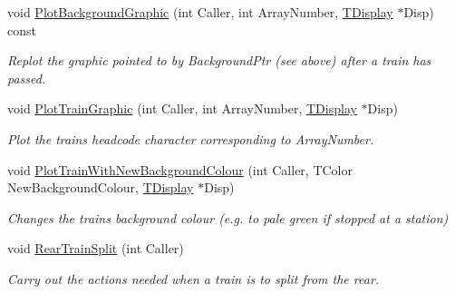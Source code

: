 \begin{DoxyCompactItemize}
\item 
\mbox{\label{class_t_train_abb6bb7d2024ac59230cbaff2ec3ee999}} 
void \mbox{\hyperlink{class_t_train_abb6bb7d2024ac59230cbaff2ec3ee999}{Plot\+Background\+Graphic}} (int Caller, int Array\+Number, \mbox{\hyperlink{class_t_display}{T\+Display}} $\ast$Disp) const
\begin{DoxyCompactList}\small\item\em Replot the graphic pointed to by Background\+Ptr (see above) after a train has passed. \end{DoxyCompactList}\item 
\mbox{\label{class_t_train_a247bd95a7c648367736b116f553f4e54}} 
void \mbox{\hyperlink{class_t_train_a247bd95a7c648367736b116f553f4e54}{Plot\+Train\+Graphic}} (int Caller, int Array\+Number, \mbox{\hyperlink{class_t_display}{T\+Display}} $\ast$Disp)
\begin{DoxyCompactList}\small\item\em Plot the train\textquotesingle{}s headcode character corresponding to Array\+Number. \end{DoxyCompactList}\item 
\mbox{\label{class_t_train_abfa6da75d034c737d53819e6edbfa3dc}} 
void \mbox{\hyperlink{class_t_train_abfa6da75d034c737d53819e6edbfa3dc}{Plot\+Train\+With\+New\+Background\+Colour}} (int Caller, T\+Color New\+Background\+Colour, \mbox{\hyperlink{class_t_display}{T\+Display}} $\ast$Disp)
\begin{DoxyCompactList}\small\item\em Changes the train\textquotesingle{}s background colour (e.\+g. to pale green if stopped at a station) \end{DoxyCompactList}\item 
\mbox{\label{class_t_train_ad64c5823265b0c611c2e5f0613317aa5}} 
void \mbox{\hyperlink{class_t_train_ad64c5823265b0c611c2e5f0613317aa5}{Rear\+Train\+Split}} (int Caller)
\begin{DoxyCompactList}\small\item\em Carry out the actions needed when a train is to split from the rear. \end{DoxyCompactList}\item 
\mbox{\label{class_t_train_abd68a68b5ce295ee01171615f3d2c7ec}} 

\end{DoxyCompactItemize}
